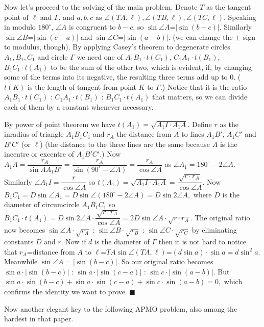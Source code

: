\documentclass[11pt,a4paper]{article}
\begin{document}
\begin{enumerate}
Now let's proceed to the solving of the main problem. Denote $T$ as the tangent point of $\ell$ and $\Gamma$, and $a,b,c$ as $\angle (TA,\ell),\angle (TB,\ell),\angle (TC,\ell)$. Speaking in modulo $180^{\circ}$, $\angle A$ is congruent to $b-c$, so $\sin\angle A$=$|\sin (b-c)|$. Similarly $\sin\angle B$=$|\sin (c-a)|$ and $\sin\angle C$=$|\sin (a-b)|.$ (we can change the $\pm$ sign to modulus, though). By applying Casey's theorem to degenerate circles $A_1, B_1, C_1$ and circle $\Gamma$ we need one of $A_1B_1\cdot t(C_1)$, $C_1A_1\cdot t(B_1)$, $B_1C_1\cdot t(A_1)$ to be the sum of the other two, which is evident, if, by changing some of the terms into its negative, the resulting three terms add up to 0. ($t(K)$ is the length of tangent from point $K$ to $\Gamma$.) Notice that it is the ratio $A_1B_1\cdot t(C_1)$ : $C_1A_1\cdot t(B_1)$ : $B_1C_1\cdot t(A_1)$ that matters, so we can divide each of them by a constant whenever necessary.

By power of point theorem we have $t(A_1)=\sqrt {A_1I\cdot A_1A}.$ Define $r$ as the inradius of triangle $A_1B_1C_1$ and $r_A$ the distance from $A$ to lines $A_1B'$, $A_1C'$ and $B'C'$ (or $\ell$) (the distance to the three lines are the same because $A$ is the incentre or excentre of $A_1B'C'$.) Now $A_1A=\dfrac{r_A}{\sin AA_1B'}=\dfrac{r_A}{\sin (90^{\circ}-\angle A)}=\dfrac{r_A}{\cos \angle A}$ as $\angle A_1=180^{\circ}-2\angle A.$ Similarly $\angle A_1I=\dfrac{r}{\cos \angle A}$ so $t(A_1)=\sqrt {A_1I\cdot A_1A}=\dfrac{\sqrt{r\cdot r_A}}{\cos \angle A}$. Now $B_1C_1=D\sin\angle A_1=D\sin\angle (180^{\circ}-2\angle A)=D\sin 2\angle A,$ where $D$ is the diameter of circumcircle $A_1B_1C_1$ so $B_1C_1\cdot t(A_1)=D\sin 2\angle A\cdot \dfrac{\sqrt{r\cdot r_A}}{\cos \angle A}=2D\sin \angle A\cdot\sqrt{r\cdot r_A}.$ The original ratio now becomes $\sin \angle A\cdot\sqrt{r_A}$ : $\sin \angle B\cdot\sqrt{r_B}$ : $\sin \angle C\cdot\sqrt{r_C}$ by eliminating constants $D$ and $r$. Now if $d$ is the diameter of $\Gamma$ then it is not hard to notice that $r_A$=distance from $A$ to $\ell$=$TA\sin\angle (TA,\ell)$=$(d\sin a)\cdot\sin a=d\sin^{2} a.$ Meanwhile $\sin\angle A=|\sin (b-c)|.$ So our original ratio becomes $\sin a\cdot|\sin (b-c)|$ : $\sin a\cdot|\sin (c-a)|$ : $\sin c\cdot|\sin (a-b)|$. But $\sin a\cdot\sin (b-c)+\sin a\cdot\sin (c-a)+\sin c\cdot\sin (a-b)=0,$ which confirms the identity we want to prove. $\blacksquare$

Now another elegant key to the following APMO problem, also among the hardest in that paper.


\end{enumerate}
\end{document}
